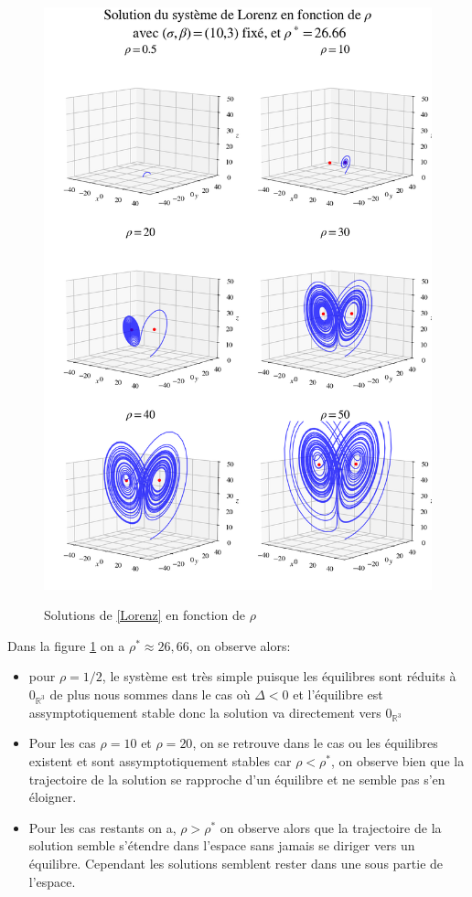 \documentclass{article}
\newcommand{\R}{\mathbb{R}}
\newtheorem[M , nocut]{prop}{Proposition}[section]
\newtheorem[M , nocut]{definition}{Définition}
\newtheorem[M , nocut]{lemme}{Lemme}
\newtheorem[L , nocut]{thm}{Théoreme}
\newtheorem[M , nocut]{cor}{Corollaire}
\begin{document}
\begin{figure}[!ht]
    \begin{center}
        \includegraphics[height=0.73\textheight]{Eq-Spm}
        \label{fig:Eq-Spm}
        \caption{Solutions de \eqref{Lorenz} en fonction de $\rho$}
    \end{center}
\end{figure}

Dans la figure \ref{fig:Eq-Spm} on a $\rho^* \approx 26,66$, on observe alors:
\begin{itemize}
    \item pour $\rho = 1/2$, le système est très simple puisque les équilibres sont réduits à $0_{\R^3}$ de plus nous sommes dans le cas où $\Delta < 0$ et l'équilibre est assymptotiquement stable donc la solution va directement vers $0_{\R^3}$
    \item  Pour les cas $\rho = 10$ et $\rho =20$, on se retrouve dans le cas ou les équilibres existent et sont assymptotiquement stables car $\rho<\rho^*$, on observe bien que la trajectoire de la solution se rapproche d'un équilibre et ne semble pas s'en éloigner.
    \item Pour les cas restants on a, $\rho>\rho^*$ on observe alors que la trajectoire de la solution semble s'étendre dans l'espace sans jamais se diriger vers un équilibre. Cependant les solutions semblent rester dans une sous partie de l'espace.
\end{itemize}
\end{document}
